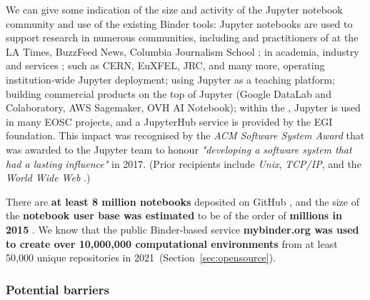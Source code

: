 \medskip

We can give some indication of the size and activity of the Jupyter notebook
community and use of the existing Binder tools: Jupyter notebooks are used to
support research in numerous communities, including
{} and practitioners of  at the LA Times, BuzzFeed News, Columbia Journalism School
\cite{latimes-datadesk} \cite{columbia-nytimes} \cite{data-journalism};
 in academia, industry and services \cite{Perkel2018};
{} such as CERN, EuXFEL, JRC, and many more,
operating institution-wide Jupyter deployment;
{} using Jupyter as a teaching platform;
{} building commercial products on the
top of Jupyter (Google DataLab and Colaboratory, AWS Sagemaker, OVH AI Notebook);
within the , Jupyter is used in many EOSC
projects, and a JupyterHub service is provided by the EGI foundation.
This impact was recognised by the \emph{ACM Software System Award} that was
awarded to the Jupyter team to honour \emph{"developing a software system that
had a lasting influence"} in 2017. (Prior recipients include \emph{Unix},
\emph{TCP/IP}, and the \emph{World Wide Web} \cite{acm-award}.)

There are \textbf{at least 8 million notebooks} deposited on GitHub \cite{notebookcount}, and
the size of the \textbf{notebook user base was estimated} to be of the order of
\textbf{millions in 2015} \cite{jupyter-grant}. We know that the public Binder-based service \textbf{mybinder.org
was used to create over 10,000,000 computational environments}
from at least 50,000 unique repositories in 2021~(Section~\ref{sec:opensource}).



\subsubsection{Potential barriers}

